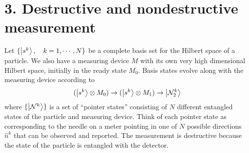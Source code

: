 \documentclass[a4paper,twoside]{article}
\begin{document}
\section*{3. Destructive and nondestructive measurement}
Let $ \{\ket{s^k} \qc k = 1, \cdots, N\} $ be a complete basis set for the Hilbert space of a particle. We also have a measuring device $ M $ with its own very high dimensional Hilbert space, initially in the ready state $ M_0 $. Basis states evolve along with the measuring device according to
\begin{equation}
    (\ket{s^k} \otimes M_0) \to (\ket{s^k} \otimes M_1) \to \ket{\mathcal{N}_2^k}
\end{equation}
where $ \{\ket{\mathcal{N}^k}\} $ is a set of “pointer states” consisting of $ N $ different entangled states of the particle and measuring device. Think of each pointer state as corresponding to the needle on a meter pointing in one of $ N $ possible directions $ \hat{n}^k $ that can be observed and reported. The measurement is destructive because the state of the particle is entangled with the detector.
\end{document}
